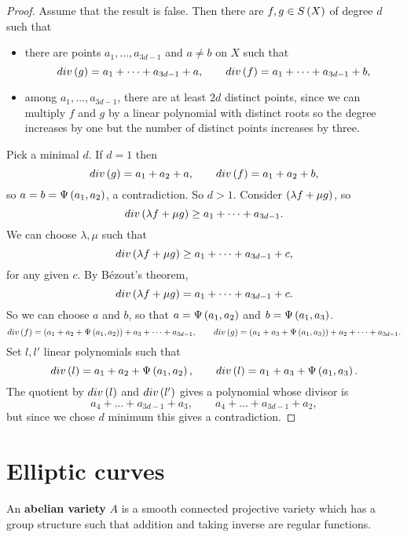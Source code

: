 \begin{proof}
Assume that the result is false. Then there are $ f, g \in S\left( X \right) $ of degree $ d $ such that
\begin{itemize}
\item there are points $ a_1, \dots, a_{3d - 1} $ and $ a \ne b $ on $ X $ such that
$$ div\left( g \right) = a_1 + \dots + a_{3d - 1} + a, \qquad div\left( f \right) = a_1 + \dots + a_{3d - 1} + b, $$
\item among $ a_1, \dots, a_{3d - 1} $, there are at least $ 2d $ distinct points, since we can multiply $ f $ and $ g $ by a linear polynomial with distinct roots so the degree increases by one but the number of distinct points increases by three.
\end{itemize}
Pick a minimal $ d $. If $ d = 1 $ then
$$ div\left( g \right) = a_1 + a_2 + a, \qquad div\left( f \right) = a_1 + a_2 + b, $$
so $ a = b = \Psi\left( a_1, a_2 \right) $, a contradiction. So $ d > 1 $. Consider $ \left( \lambda f + \mu g \right) $, so
$$ div\left( \lambda f + \mu g \right) \ge a_1 + \dots + a_{3d - 1}. $$
We can choose $ \lambda, \mu $ such that
$$ div\left( \lambda f + \mu g \right) \ge a_1 + \dots + a_{3d - 1} + c, $$
for any given $ c $. By B\'ezout's theorem,
$$ div\left( \lambda f + \mu g \right) = a_1 + \dots + a_{3d - 1} + c. $$
So we can choose $ a $ and $ b $, so that $ a = \Psi\left( a_1, a_2 \right) $ and $ b = \Psi\left( a_1, a_3 \right) $.
$$ div\left( f \right) = \left( a_1 + a_2 + \Psi\left( a_1, a_2 \right) \right) + a_3 + \dots + a_{3d - 1}, \qquad div\left( g \right) = \left( a_1 + a_3 + \Psi\left( a_1, a_3 \right) \right) + a_2 + \dots + a_{3d - 1}. $$
Set $ l, l' $ linear polynomials such that
$$ div\left( l \right) = a_1 + a_2 + \Psi\left( a_1, a_2 \right), \qquad div\left( l \right) = a_1 + a_3 + \Psi\left( a_1, a_3 \right). $$
The quotient by $ div\left( l \right) $ and $ div\left( l' \right) $ gives a polynomial whose divisor is
$$ a_4 + \dots + a_{3d - 1} + a_3, \qquad a_4 + \dots + a_{3d - 1} + a_2, $$
but since we chose $ d $ minimum this gives a contradiction.
\end{proof}

\pagebreak

\section{Elliptic curves}


\begin{definition}
An \textbf{abelian variety} $ A $ is a smooth connected projective variety which has a group structure such that addition and taking inverse are regular functions.
\end{definition}

